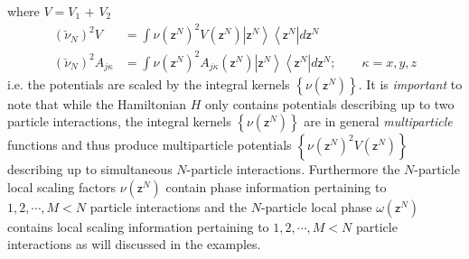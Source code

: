 \documentclass[aps,preprint]{revtex4}%
\begin{document}
where $V=V_{1}$ $+$ $V_{2}$
\begin{align}
\left(  \breve{\nu}_{N}\right)  ^{2}V  &  =\int\nu\left(  \mathsf{z}%
^{N}\right)  ^{2}V\left(  \mathsf{z}^{N}\right)  \left\vert \mathsf{z}%
^{N}\right\rangle \left\langle \mathsf{z}^{N}\right\vert d\mathsf{z}%
^{N}\nonumber\\
\left(  \breve{\nu}_{N}\right)  ^{2}A_{j\kappa}  &  =\int\nu\left(
\mathsf{z}^{N}\right)  ^{2}A_{j\kappa}\left(  \mathsf{z}^{N}\right)
\left\vert \mathsf{z}^{N}\right\rangle \left\langle \mathsf{z}^{N}\right\vert
d\mathsf{z}^{N};\qquad\kappa=x,y,z
\end{align}
i.e. the potentials are scaled by the integral kernels $\left\{  \nu\left(
\mathsf{z}^{N}\right)  \right\}  $. It is \emph{important }to note that while
the Hamiltonian $H$ only contains potentials describing up to two particle
interactions, the integral kernels $\left\{  \nu\left(  \mathsf{z}^{N}\right)
\right\}  $ are in general \emph{multiparticle} functions and thus produce
multiparticle potentials $\left\{  \nu\left(  \mathsf{z}^{N}\right)
^{2}V\left(  \mathsf{z}^{N}\right)  \right\}  $ describing up to simultaneous
$N$-particle interactions. Furthermore the $N$-particle local scaling factors
$\nu\left(  \mathsf{z}^{N}\right)  $ contain phase information pertaining to
$1,2,\cdots,M<N$ particle interactions and the $N$-particle local phase
$\omega\left(  \mathsf{z}^{N}\right)  $ contains local scaling information
pertaining to $1,2,\cdots,M<N$ particle interactions as will discussed in the examples.
\end{document}
